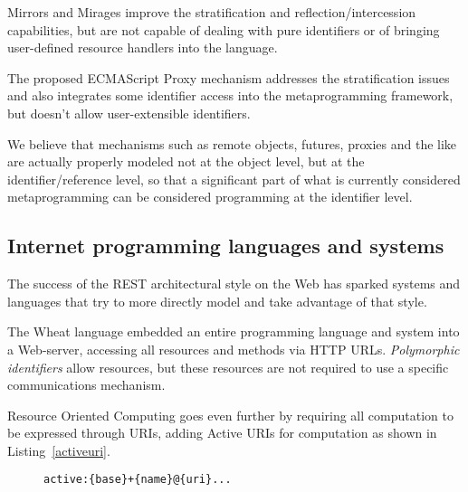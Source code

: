 \documentclass[preprint,authoryear]{acm_proc_article-sp}
\begin{document}
Mirrors \cite{mirrors} and Mirages \cite{mirages} improve the stratification and
reflection/intercession capabilities, but are not capable of dealing with pure
identifiers or of bringing user-defined resource handlers into the language.

The proposed ECMAScript Proxy mechanism \cite{VanCutsemMiller} addresses
the stratification issues and also integrates some identifier access into the 
metaprogramming framework, but doesn't allow user-extensible identifiers.

We believe that mechanisms such as remote objects, futures, proxies and the like
are actually properly modeled not at the object level, but at the identifier/reference
level, so that a significant part of what is currently considered metaprogramming
can be considered programming at the identifier level.

\subsection{Internet programming languages and systems}

The success of the REST architectural style\cite{fielding-rest} on the Web has sparked
systems and languages that try to more directly model and take advantage of that
style.

The Wheat language \cite{wheat} embedded an entire programming language
and system into a Web-server, accessing all resources and methods via
HTTP URLs.  \emph{Polymorphic identifiers} allow resources, but these resources
are not required to use a specific communications mechanism.


Resource Oriented Computing \cite{roc} goes even further by
requiring all computation to be expressed through URIs, adding Active URIs
for computation as shown in Listing~\ref{activeuri}.   



\begin{figure}[htbp]
\begin{lstlisting}[style=L,label= activeuri,caption=Active URI.]
  active:{base}+{name}@{uri}...
\end{lstlisting}
\end{figure}
\end{document}
